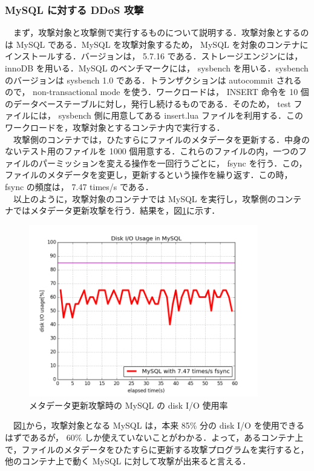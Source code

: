 \documentclass[graduation-thesis]{jsarticle}
\begin{document}
\subsubsection{MySQL に対する DDoS 攻撃}
　まず，攻撃対象と攻撃側で実行するものについて説明する．攻撃対象とするのは MySQL である．MySQL を攻撃対象するため， MySQL を対象のコンテナにインストールする．バージョンは， 5.7.16 である．ストレージエンジンには， innoDB を用いる．MySQL のベンチマークには， sysbench を用いる．sysbench のバージョンは sysbench 1.0 である．トランザクションは autocommit されるので， non-transactional mode を使う．ワークロードは， INSERT 命令を 10 個のデータベーステーブルに対し，発行し続けるものである．そのため， test ファイルには， sysbench 側に用意してある insert.lua ファイルを利用する．このワークロードを，攻撃対象とするコンテナ内で実行する．\\
　攻撃側のコンテナでは，ひたすらにファイルのメタデータを更新する．中身のないテスト用のファイルを 1000 個用意する．これらのファイルの内，一つのファイルのパーミッションを変える操作を一回行うごとに， fsync を行う．この，ファイルのメタデータを変更し，更新するという操作を繰り返す．この時， fsync の頻度は， 7.47 times/s である．\\
　以上のように，攻撃対象のコンテナでは MySQL を実行し，攻撃側のコンテナではメタデータ更新攻撃を行う．結果を，図\ref{fig:mysql-example}に示す．\\
\begin{figure}[H]
	\begin{center}
		\includegraphics[width=10.0cm]{images/FiguresForGraduation/mysql_single1.png}
		\caption{メタデータ更新攻撃時の MySQL の disk I/O 使用率}
		\label{fig:mysql-example}
	\end{center}
\end{figure}
　図\ref{fig:mysql-example}から，攻撃対象となる MySQL は，本来 85\% 分の disk I/O を使用できるはずであるが， 60\% しか使えていないことがわかる．よって，あるコンテナ上で，ファイルのメタデータをひたすらに更新する攻撃プログラムを実行すると，他のコンテナ上で動く MySQL に対して攻撃が出来ると言える．\\
\end{document}
